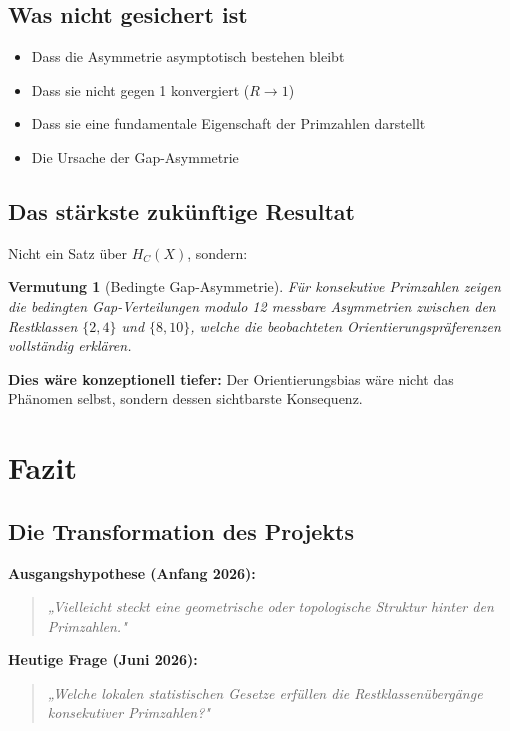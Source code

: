 \documentclass[11pt,a4paper]{article}
\newtheorem{conjecture}[theorem]{Vermutung}
\begin{document}
\subsection{Was nicht gesichert ist}

\begin{itemize}
\item[$\times$] Dass die Asymmetrie asymptotisch bestehen bleibt
\item[$\times$] Dass sie nicht gegen 1 konvergiert ($R \to 1$)
\item[$\times$] Dass sie eine fundamentale Eigenschaft der Primzahlen darstellt
\item[$\times$] Die Ursache der Gap-Asymmetrie
\end{itemize}

\subsection{Das stärkste zukünftige Resultat}

Nicht ein Satz über $H_C(X)$, sondern:

\begin{conjecture}[Bedingte Gap-Asymmetrie]
Für konsekutive Primzahlen zeigen die bedingten Gap-Verteilungen modulo 12 messbare Asymmetrien zwischen den Restklassen $\{2, 4\}$ und $\{8, 10\}$, welche die beobachteten Orientierungspräferenzen vollständig erklären.
\end{conjecture}

\textbf{Dies wäre konzeptionell tiefer:} Der Orientierungsbias wäre nicht das Phänomen selbst, sondern dessen sichtbarste Konsequenz.

\section{Fazit}

\subsection{Die Transformation des Projekts}

\textbf{Ausgangshypothese (Anfang 2026):}
\begin{quote}
\textit{„Vielleicht steckt eine geometrische oder topologische Struktur hinter den Primzahlen."}
\end{quote}

\textbf{Heutige Frage (Juni 2026):}
\begin{quote}
\textit{„Welche lokalen statistischen Gesetze erfüllen die Restklassenübergänge konsekutiver Primzahlen?"}
\end{quote}
\end{document}
